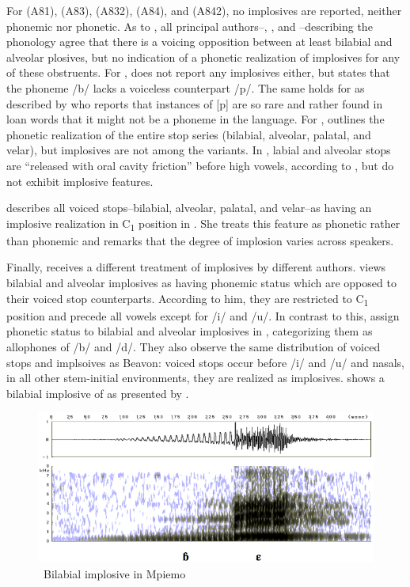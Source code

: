 \documentclass[output=paper]{LSP/langsci}
\begin{document}
For  (A81),  (A83),  (A832),  (A84), and  (A842), no implosives are reported, neither phonemic nor phonetic.   As to , all principal authors--\citet{Lemb1974}, \citet{Dieu1976}, and \citet{Yemmene2004}--describing the phonology agree that there is a voicing opposition between at least bilabial and alveolar plosives, but no indication of a phonetic realization of implosives for any of these obstruents.  For , \citet{Heath2003} does not report any implosives either, but states that the phoneme /b/ lacks a voiceless counterpart /p/. The same holds for  as described by \citet{Henson2007} who reports that instances of [p] are so rare and rather found in loan words that it might not be a phoneme in the language. For , \citet{Beavon2006} outlines the phonetic realization of the entire stop series (bilabial, alveolar, palatal, and velar), but implosives are not among the variants. In , labial and alveolar stops are ``released with oral cavity friction'' before high vowels, according to \citet[134]{Beavon1983}, but do not exhibit implosive features.


\citet[147]{Cheucle2014} describes all voiced stops--bilabial, alveolar, palatal, and velar--as having an implosive realization in C\textsubscript{1} position in . She treats this feature as phonetic rather than phonemic and remarks that the degree of implosion varies across speakers.

Finally,  receives a different treatment of implosives by different authors.  \citet{Beavon1978} views bilabial and alveolar implosives as having phonemic status which are opposed to their voiced stop counterparts. According to him, they are restricted to C\textsubscript{1} position and precede all vowels except for /i/ and /u/. In contrast to this, \citet{Thornell2004} assign phonetic status to bilabial and alveolar implosives in , categorizing them as allophones of /b/ and /d/. They also observe the same distribution of voiced stops and implsoives as Beavon: voiced stops occur before /i/ and /u/ and nasals, in all other stem-initial environments, they are realized as implosives.  shows a bilabial implosive of  as presented by \citet[172]{Thornell2004}.

\begin{figure}
\caption{\ Bilabial implosive in Mpiemo} 
\label{fig:grimm:1}
\includegraphics[width=\textwidth]{figures/mpiemoB.jpg}
\end{figure}
\end{document}
